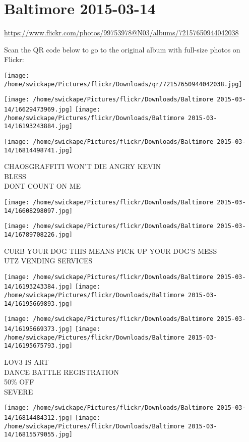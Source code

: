 \documentclass[10pt,letterpaper]{article}
\title{}
\author{}
\date{}
\begin{document}
\section*{Baltimore 2015-03-14}

\url{https://www.flickr.com/photos/99753978@N03/albums/72157650944042038}

Scan the QR code below to go to the original album with full-size photos on Flickr:

\texttt{[image: /home/swickape/Pictures/flickr/Downloads/qr/72157650944042038.jpg]}
\pagebreak

\texttt{[image: /home/swickape/Pictures/flickr/Downloads/Baltimore 2015-03-14/16629473969.jpg]}
\texttt{[image: /home/swickape/Pictures/flickr/Downloads/Baltimore 2015-03-14/16193243884.jpg]}

\vspace{0.25in}
\texttt{[image: /home/swickape/Pictures/flickr/Downloads/Baltimore 2015-03-14/16814498741.jpg]}

CHAOSGRAFFITI WON'T DIE ANGRY KEVIN\\
BLESS\\
DONT COUNT ON ME
\pagebreak

\texttt{[image: /home/swickape/Pictures/flickr/Downloads/Baltimore 2015-03-14/16608298097.jpg]}

\vspace{0.25in}
\texttt{[image: /home/swickape/Pictures/flickr/Downloads/Baltimore 2015-03-14/16789708226.jpg]}

CURB YOUR DOG THIS MEANS PICK UP YOUR DOG'S MESS\\
UTZ VENDING SERVICES
\pagebreak

\texttt{[image: /home/swickape/Pictures/flickr/Downloads/Baltimore 2015-03-14/16193243384.jpg]}
\texttt{[image: /home/swickape/Pictures/flickr/Downloads/Baltimore 2015-03-14/16195669893.jpg]}

\texttt{[image: /home/swickape/Pictures/flickr/Downloads/Baltimore 2015-03-14/16195669373.jpg]}
\texttt{[image: /home/swickape/Pictures/flickr/Downloads/Baltimore 2015-03-14/16195675793.jpg]}

LOV3 IS ART\\
DANCE BATTLE REGISTRATION\\
50\% OFF\\
SEVERE
\pagebreak

\texttt{[image: /home/swickape/Pictures/flickr/Downloads/Baltimore 2015-03-14/16814484312.jpg]}
\texttt{[image: /home/swickape/Pictures/flickr/Downloads/Baltimore 2015-03-14/16815579055.jpg]}
\end{document}
